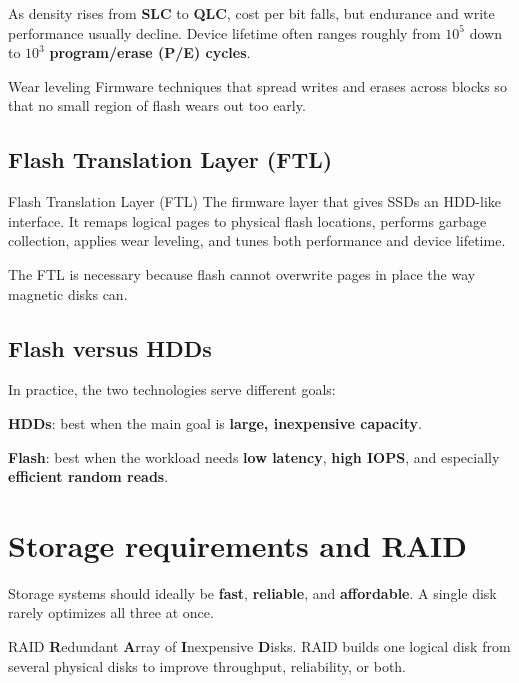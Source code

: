\documentclass[../../dis.tex]{subfiles}
\begin{document}
As density rises from \textbf{SLC} to \textbf{QLC}, cost per bit falls, but endurance and write performance usually decline. Device lifetime often ranges roughly from \(10^5\) down to \(10^3\) \textbf{program/erase (P/E) cycles}.

\begin{concept}{Wear leveling}
Firmware techniques that spread writes and erases across blocks so that no small region of flash wears out too early.
\end{concept}

\subsection{Flash Translation Layer (FTL)}
\begin{concept}{Flash Translation Layer (FTL)}
The firmware layer that gives SSDs an HDD-like interface. It remaps logical pages to physical flash locations, performs garbage collection, applies wear leveling, and tunes both performance and device lifetime.
\end{concept}

The FTL is necessary because flash cannot overwrite pages in place the way magnetic disks can.

\subsection{Flash versus HDDs}
In practice, the two technologies serve different goals:
\begin{dashlist}
    \item \textbf{HDDs}: best when the main goal is \textbf{large, inexpensive capacity}.
    \item \textbf{Flash}: best when the workload needs \textbf{low latency}, \textbf{high IOPS}, and especially \textbf{efficient random reads}.
\end{dashlist}

\section{Storage requirements and RAID}
Storage systems should ideally be \textbf{fast}, \textbf{reliable}, and \textbf{affordable}. A single disk rarely optimizes all three at once.

\begin{concept}{RAID}
\textbf{R}edundant \textbf{A}rray of \textbf{I}nexpensive \textbf{D}isks. RAID builds one logical disk from several physical disks to improve throughput, reliability, or both.
\end{concept}
\end{document}
